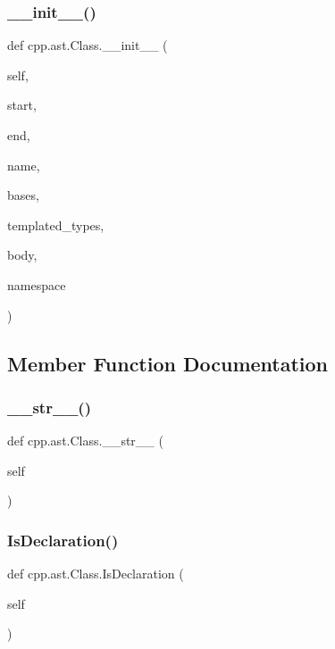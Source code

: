 \subsubsection{\texorpdfstring{\+\_\+\+\_\+init\+\_\+\+\_\+()}{\_\_init\_\_()}}
{\footnotesize\ttfamily def cpp.\+ast.\+Class.\+\_\+\+\_\+init\+\_\+\+\_\+ (\begin{DoxyParamCaption}\item[{}]{self,  }\item[{}]{start,  }\item[{}]{end,  }\item[{}]{name,  }\item[{}]{bases,  }\item[{}]{templated\+\_\+types,  }\item[{}]{body,  }\item[{}]{namespace }\end{DoxyParamCaption})}



\subsection{Member Function Documentation}
\mbox{\label{classcpp_1_1ast_1_1_class_a0a63f6fab75d61ffac6fb9f1c29ae84d}} 
\subsubsection{\texorpdfstring{\+\_\+\+\_\+str\+\_\+\+\_\+()}{\_\_str\_\_()}}
{\footnotesize\ttfamily def cpp.\+ast.\+Class.\+\_\+\+\_\+str\+\_\+\+\_\+ (\begin{DoxyParamCaption}\item[{}]{self }\end{DoxyParamCaption})}

\mbox{\label{classcpp_1_1ast_1_1_class_a4758bfb7c00410575932974e1ed8b7da}} 
\subsubsection{\texorpdfstring{Is\+Declaration()}{IsDeclaration()}}
{\footnotesize\ttfamily def cpp.\+ast.\+Class.\+Is\+Declaration (\begin{DoxyParamCaption}\item[{}]{self }\end{DoxyParamCaption})}

